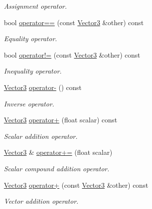 \begin{DoxyCompactItemize}
\begin{DoxyCompactList}\small\item\em Assignment operator. \end{DoxyCompactList}\item 
bool \hyperlink{classchaos_1_1gfx_1_1_vector3_aea8b9895ae2781f79a02dde0e22a1938}{operator==} (const \hyperlink{classchaos_1_1gfx_1_1_vector3}{Vector3} \&other) const 
\begin{DoxyCompactList}\small\item\em Equality operator. \end{DoxyCompactList}\item 
bool \hyperlink{classchaos_1_1gfx_1_1_vector3_ad8ceb4ba622ba969ab58f163d32f8e6e}{operator!=} (const \hyperlink{classchaos_1_1gfx_1_1_vector3}{Vector3} \&other) const 
\begin{DoxyCompactList}\small\item\em Inequality operator. \end{DoxyCompactList}\item 
\hyperlink{classchaos_1_1gfx_1_1_vector3}{Vector3} \hyperlink{classchaos_1_1gfx_1_1_vector3_acc137556656ff2f4b16972f8d6566333}{operator-\/} () const 
\begin{DoxyCompactList}\small\item\em Inverse operator. \end{DoxyCompactList}\item 
\hyperlink{classchaos_1_1gfx_1_1_vector3}{Vector3} \hyperlink{classchaos_1_1gfx_1_1_vector3_a70135c109acc45256567d9c50f160bda}{operator+} (float scalar) const 
\begin{DoxyCompactList}\small\item\em Scalar addition operator. \end{DoxyCompactList}\item 
\hyperlink{classchaos_1_1gfx_1_1_vector3}{Vector3} \& \hyperlink{classchaos_1_1gfx_1_1_vector3_acb76c6c076cc7448503b09edab578569}{operator+=} (float scalar)
\begin{DoxyCompactList}\small\item\em Scalar compound addition operator. \end{DoxyCompactList}\item 
\hyperlink{classchaos_1_1gfx_1_1_vector3}{Vector3} \hyperlink{classchaos_1_1gfx_1_1_vector3_a94c67b5eb0b4bba1732019bc9eef459f}{operator+} (const \hyperlink{classchaos_1_1gfx_1_1_vector3}{Vector3} \&other) const 
\begin{DoxyCompactList}\small\item\em Vector addition operator. \end{DoxyCompactList}\item 

\end{DoxyCompactItemize}
